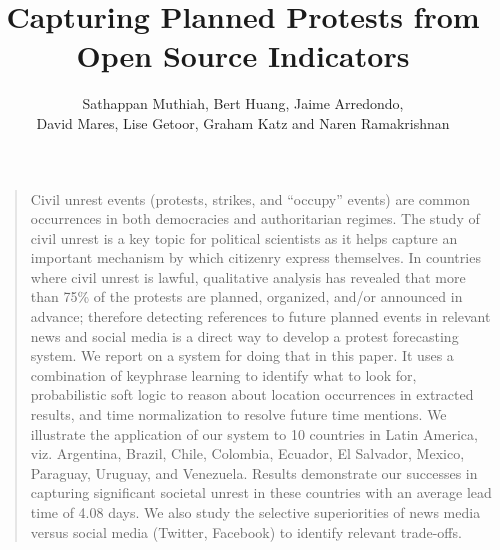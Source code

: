 \documentclass[letterpaper]{article}
\title{Capturing Planned Protests from Open Source Indicators}
\author{Sathappan Muthiah, Bert Huang, Jaime Arredondo, \\
David Mares, Lise Getoor, Graham Katz and Naren Ramakrishnan}
\begin{document}
\newcommand{\then}{\Rightarrow}
\newcommand{\softor}{\operatornamewithlimits{{\vee}}}
\newcommand{\softand}{\operatornamewithlimits{{\wedge}}}
\newcommand{\softthen}{\operatornamewithlimits{{\then}}}
\newcommand{\softneg}{\operatornamewithlimits{{\neg}}}

\newtheorem{exmp}{Example}
\maketitle
\onecolumn


\begin{quote} %
Civil unrest events (protests, strikes, and ``occupy'' events) are common
occurrences in both democracies and authoritarian regimes. The study of civil
unrest is a key topic for political scientists as it helps capture an important
mechanism by which citizenry express themselves. In countries where civil
unrest is lawful, qualitative analysis has revealed that more than 75\% of the
protests are planned, organized, and/or announced in advance; therefore
detecting references to future planned events in relevant news and social media
is a direct way to develop a protest forecasting system. We report on a system
for doing that in this paper. It uses a combination of keyphrase learning to
identify what to look for, probabilistic soft logic to reason about location
occurrences in extracted results, and time normalization to resolve future time
mentions. We illustrate the application of our system to 10 countries in Latin
America, viz. Argentina, Brazil, Chile, Colombia, Ecuador, El Salvador, Mexico,
Paraguay, Uruguay, and Venezuela. Results demonstrate our successes in
capturing significant societal unrest in these countries with an average lead
time of 4.08 days. We also study the selective superiorities of news media
versus social media (Twitter, Facebook) to identify relevant trade-offs.
\end{quote}
\end{document}
